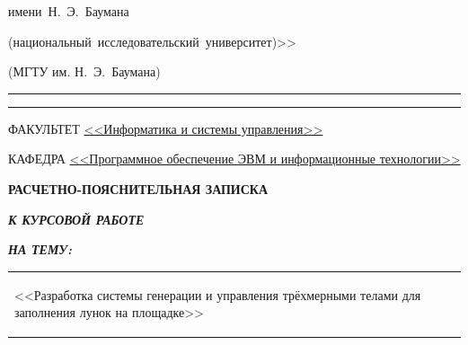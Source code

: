 \begin{titlepage}
\begin{center}
\begin{minipage}{0.85\textwidth}
{{                имени~Н.~Э.~Баумана

                (национальный~исследовательский~университет)>>
            }

                {(МГТУ им. Н.~Э.~Баумана)}
                \vspace{0.1cm}
            }
        \end{minipage}

        \vspace{0.2cm}
        \rule{\linewidth}{2.8pt}
        \rule[3ex]{\linewidth}{1pt}

        \begin{flushleft}
            {ФАКУЛЬТЕТ \uline{<<Информатика и системы управления>> \hfill}}

            \vspace{0.5cm}

            {КАФЕДРА \uline{<<Программное обеспечение ЭВМ и информационные технологии>> \hfill}}
        \end{flushleft}

        \vspace{2cm}

        {
            \Large{\textbf{РАСЧЕТНО-ПОЯСНИТЕЛЬНАЯ ЗАПИСКА}}

            \vspace{0.8cm}

            \large{\textbf{\textit{К КУРСОВОЙ РАБОТЕ}}}

            \vspace{0.75cm}

            \large{\textbf{\textit{НА ТЕМУ:}}}
        }

        \vspace{0.5cm}



        \begin{tabularx}{\linewidth}{@{}X@{}}
            \begin{center}
                \large <<Разработка \large системы \large генерации \large и \large управления \large трёхмерными \large телами \large для \large заполнения \large лунок \large на \large площадке>>
                    \hfill
            \end{center}
        \end{tabularx}



\end{center}
\end{titlepage}
